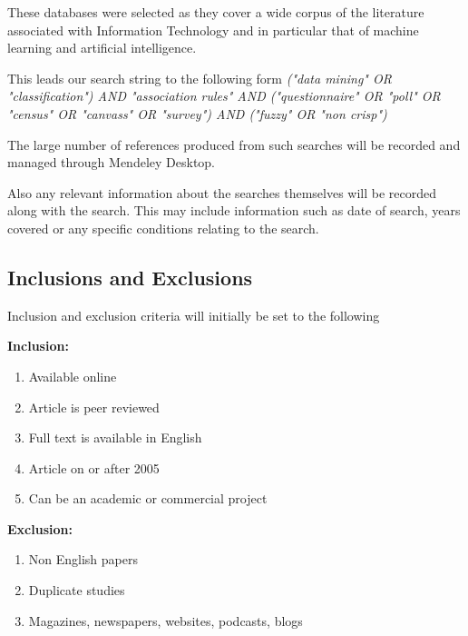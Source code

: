 These databases were selected as they cover a wide corpus of the literature associated with Information Technology and in particular that of machine learning and artificial intelligence.



This leads our search string to the following form \textit{("data mining" OR "classification")
  AND "association rules" AND ("questionnaire" OR "poll" OR "census" OR "canvass" OR "survey")
  AND ("fuzzy" OR "non crisp") }

The large number of references produced from such searches will be recorded and managed through Mendeley Desktop.

Also any relevant information about the searches themselves will be recorded along with the search. This may include information such as date of search, years covered or any specific conditions relating to the search.

\subsection{Inclusions and Exclusions}

\noindent
Inclusion and exclusion criteria will initially be set to the following

\noindent
\textbf{Inclusion:}
\begin{enumerate}
  \item Available online
  \item Article is peer reviewed
  \item Full text is available in English
  \item Article on or after 2005
  \item Can be an academic or commercial project
\end{enumerate}

\noindent
\textbf{Exclusion:}
\begin{enumerate}
  \item Non English papers
  \item Duplicate studies
  \item Magazines, newspapers, websites, podcasts, blogs
\end{enumerate}

